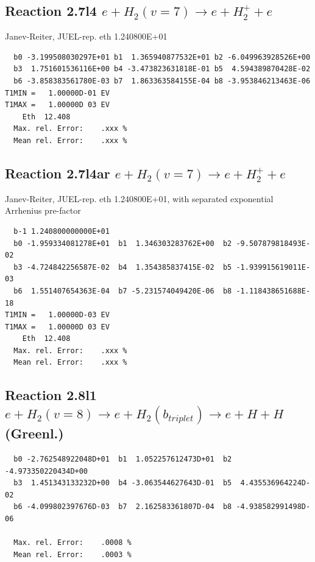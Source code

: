 \documentclass[12pt,dvipdfmx]{article}
\begin{document}
\subsection{
Reaction 2.7l4
 $ e + H_2(v=7) \rightarrow e + H_2^+  + e$
}
Janev-Reiter, JUEL-rep. eth 1.240800E+01

\begin{small}\begin{verbatim}
  b0 -3.199508030297E+01 b1  1.365940877532E+01 b2 -6.049963928526E+00
  b3  1.751601536116E+00 b4 -3.473823631818E-01 b5  4.594389870428E-02
  b6 -3.858383561780E-03 b7  1.863363584155E-04 b8 -3.953846213463E-06
T1MIN =   1.00000D-01 EV
T1MAX =   1.00000D 03 EV
    Eth  12.408
  Max. rel. Error:    .xxx %
  Mean rel. Error:    .xxx %
\end{verbatim}\end{small}

\subsection{
Reaction 2.7l4ar
 $ e + H_2(v=7) \rightarrow e + H_2^+  + e$
}
Janev-Reiter, JUEL-rep. eth 1.240800E+01,
with separated exponential Arrhenius pre-factor

\begin{small}\begin{verbatim}
  b-1 1.240800000000E+01
  b0 -1.959334081278E+01  b1  1.346303283762E+00  b2 -9.507879818493E-02
  b3 -4.724842256587E-02  b4  1.354385837415E-02  b5 -1.939915619011E-03
  b6  1.551407654363E-04  b7 -5.231574049420E-06  b8 -1.118438651688E-18
T1MIN =   1.00000D-03 EV
T1MAX =   1.00000D 03 EV
    Eth  12.408
  Max. rel. Error:    .xxx %
  Mean rel. Error:    .xxx %
\end{verbatim}\end{small}

\newpage
\subsection{
Reaction 2.8l1
$ e + H_2(v=8) \rightarrow e + H_2(b_{triplet})\rightarrow e +  H + H $ (Greenl.)
}


\begin{small}\begin{verbatim}
  b0 -2.762548922048D+01  b1  1.052257612473D+01  b2 -4.973350220434D+00
  b3  1.451343133232D+00  b4 -3.063544627643D-01  b5  4.435536964224D-02
  b6 -4.099802397676D-03  b7  2.162583361807D-04  b8 -4.938582991498D-06

  Max. rel. Error:    .0008 %
  Mean rel. Error:    .0003 %
\end{verbatim}\end{small}
\end{document}
